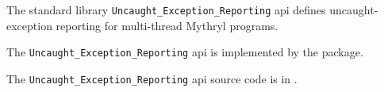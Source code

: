 
The standard library {\tt Uncaught\_Exception\_Reporting} api defines uncaught-exception reporting for multi-thread Mythryl programs.

The {\tt Uncaught\_Exception\_Reporting} api is implemented by the  package.

The {\tt Uncaught\_Exception\_Reporting} api source code is in .
